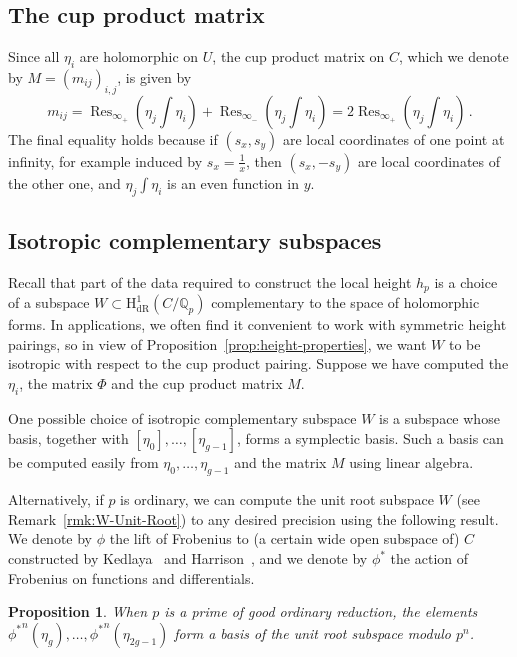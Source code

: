 \documentclass[11pt, a4paper]{amsart}
\newcommand{\Q}{\mathbb{Q}}
\newcommand{\hdr}{\operatorname{H^1_{dR}}}
\newcommand{\Res}{\operatorname{Res}}
\newtheorem{proposition}[theorem]{Proposition}
\theoremstyle{remark}
\numberwithin{equation}{section}
\newcommand{\sg}{{}}
\newcommand{\sm}{{}}
\begin{document}
\subsection{The cup product matrix}\label{cup} 
Since all $\eta_i$ are holomorphic on $U$, 
the cup product matrix on $C$, which we denote by $M=(m_{ij})_{i,j}$, is given by 
\[
m_{ij}=\Res_{\infty_+}\left(\eta_j\int\eta_i\right)+\Res_{\infty_-}\left(\eta_j\int\eta_i\right) =2\Res_{\infty_+}\left(\eta_j\int\eta_i\right)\,.
\]
The final equality holds because if $(s_x,s_y)$ are local coordinates of one point at infinity, for example induced by $s_x=\frac{1}{x}$, then $(s_x,-s_y)$ are local coordinates of the other one, and $\eta_j\int\eta_i$ is an even function in $y$. 

\subsection{Isotropic complementary subspaces}\label{subsec:subspace}
\sm{Recall that part of the data required to construct the local height $h_p$ is a 
choice of a subspace $W \subset \hdr(C/\Q_p)$ 
    complementary to the space of holomorphic forms. In applications, we
    often find it convenient to work with symmetric height pairings, so in view of Proposition~\ref{prop:height-properties}, we want $W$ to be isotropic with respect to the cup product pairing. Suppose we have computed the $\eta_i$, the matrix $\Phi$ and the cup product matrix $M$.}

One possible choice of isotropic complementary subspace $W$ is a subspace 
whose basis, together with $[\eta_0],\ldots,[\eta_{g-1}]$,
forms a symplectic basis. \sm{Such a basis can be computed easily from $\eta_0,\ldots,\eta_{g-1}$ and the matrix $M$ using linear algebra.}

Alternatively, if $p$ is ordinary, we can compute the unit root
subspace $W$ \sm{(see Remark~\ref{rmk:W-Unit-Root})} to any desired precision using the
following result. We denote by $\phi$ the lift of Frobenius to (a certain wide open
subspace of) $C$ constructed by
Kedlaya~\cite{Kedlaya-MW-reduction} and
Harrison~\cite{Harrison-Even-Deg-MW}, and we denote by $\phi^*$ the action of Frobenius 
on functions and differentials. 
\begin{proposition}\label{prop:unit-root-subspace}{\cite[Proposition 6.1]{BBHeights}}
\sg{When $p$ is a prime of good ordinary reduction, the elements } ${\phi^*}^n(\eta_g), \ldots , {\phi^*}^n(\eta_{2g-1})$
form a basis of the unit root subspace modulo $p^n$.
\end{proposition}
\end{document}
